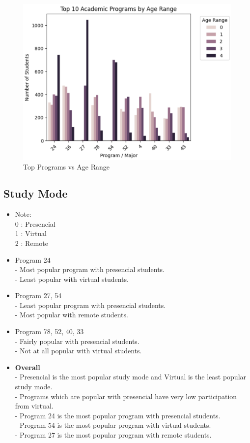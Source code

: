 \documentclass[12pt]{article}
\begin{document}
\begin{figure}[H]
    \centering
    \includegraphics[width=0.7\linewidth]{top_programs_age_range.png}
    \caption{Top Programs vs Age Range}
\end{figure}

\subsection{Study Mode}

\begin{itemize}
    \item Note:\\
    0 : Presencial\\
    1 : Virtual\\
    2 : Remote
    
    \item Program 24\\
    - Most popular program with presencial students.\\
    - Least popular with virtual students.

    \item Program 27, 54\\
    - Least popular program with presencial students.\\
    - Most popular with remote students.

    \item Program 78, 52, 40, 33\\
    - Fairly popular with presencial students.\\
    - Not at all popular with virtual students.

    \item \textbf{Overall}\\
    - Presencial is the most popular study mode and Virtual is the least popular study mode.\\
    - Programs which are popular with presencial have very low participation from virtual.\\
    - Program 24 is the most popular program with presencial students.\\
    - Program 54 is the most popular program with virtual students.\\
    - Program 27 is the most popular program with remote students.
\end{itemize}
\end{document}
